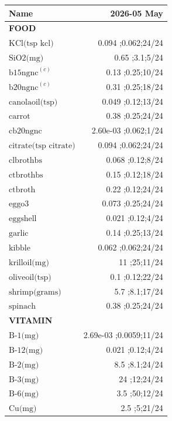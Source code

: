 \newcommand{\mjmdateminn}{2026-05-01}
\newcommand{\mjmdatemaxn}{2026-05-24}
\newcommand{\mjmsuperscriptsn}{{\bf a) } SMVT substrate. Biotin, Pantothenate, Lipoic Acid, and Iodine known to compete..{\bf c) } hamburger with varying fat percentages- 7,10,15,20, etc. ..}
\begin{table}[H]
\centering
\begin{tabular}{|l|r|}
\hline
Name&2026-05 May\\
\hline
{\bf FOOD}&\\
$\textrm{KCl(tsp~kcl)}$&0.094 ;0.062;24/24\\
$\textrm{SiO2(mg)}$&0.65 ;3.1;5/24\\
$\textrm{b15ngnc}^{\left(c\right)}$&0.13 ;0.25;10/24\\
$\textrm{b20ngnc}^{\left(c\right)}$&0.31 ;0.25;18/24\\
$\textrm{canolaoil(tsp)}$&0.049 ;0.12;13/24\\
$\textrm{carrot}$&0.38 ;0.25;24/24\\
$\textrm{cb20ngnc}$&2.60e-03 ;0.062;1/24\\
$\textrm{citrate(tsp~citrate)}$&0.094 ;0.062;24/24\\
$\textrm{clbrothbs}$&0.068 ;0.12;8/24\\
$\textrm{ctbrothbs}$&0.15 ;0.12;18/24\\
$\textrm{ctbroth}$&0.22 ;0.12;24/24\\
$\textrm{eggo3}$&0.073 ;0.25;24/24\\
$\textrm{eggshell}$&0.021 ;0.12;4/24\\
$\textrm{garlic}$&0.14 ;0.25;13/24\\
$\textrm{kibble}$&0.062 ;0.062;24/24\\
$\textrm{krilloil(mg)}$&11 ;25;11/24\\
$\textrm{oliveoil(tsp)}$&0.1 ;0.12;22/24\\
$\textrm{shrimp(grams)}$&5.7 ;8.1;17/24\\
$\textrm{spinach}$&0.38 ;0.25;24/24\\
{\bf VITAMIN}&\\
$\textrm{B-1(mg)}$&2.69e-03 ;0.0059;11/24\\
$\textrm{B-12(mg)}$&0.021 ;0.12;4/24\\
$\textrm{B-2(mg)}$&8.5 ;8.1;24/24\\
$\textrm{B-3(mg)}$&24 ;12;24/24\\
$\textrm{B-6(mg)}$&3.5 ;50;12/24\\
$\textrm{Cu(mg)}$&2.5 ;5;21/24\\

\end{tabular}
\end{table}
